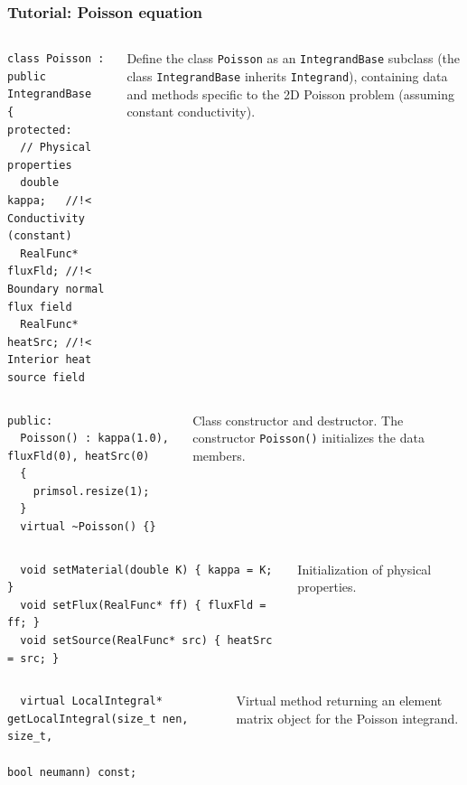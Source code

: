 \documentclass{beamer}
\begin{document}
\begin{frame}[fragile] %
 \frametitle{Tutorial: Poisson equation}

 \begin{columns}[c]
  \tiny\begin{verbatim}
class Poisson : public IntegrandBase
{
protected:
  // Physical properties
  double    kappa;   //!< Conductivity (constant)
  RealFunc* fluxFld; //!< Boundary normal flux field
  RealFunc* heatSrc; //!< Interior heat source field
  \end{verbatim}
   \small
  Define the class {\tt Poisson} as an {\tt IntegrandBase} subclass
  {\scriptsize(the class {\tt IntegrandBase} inherits {\tt Integrand})},
  containing data and methods specific to the 2D Poisson problem
  (assuming constant conductivity).
 \end{columns}
 \pause
 \begin{columns}[c]
  \tiny\begin{verbatim}
public:
  Poisson() : kappa(1.0), fluxFld(0), heatSrc(0)
  {
    primsol.resize(1);
  }
  virtual ~Poisson() {}
  \end{verbatim}
  \small
  Class constructor and destructor.
  The constructor {\tt Poisson()} initializes the data members.
 \end{columns}
 \pause
 \begin{columns}[c]
  \tiny\begin{verbatim}
  void setMaterial(double K) { kappa = K; }
  void setFlux(RealFunc* ff) { fluxFld = ff; }
  void setSource(RealFunc* src) { heatSrc = src; }
  \end{verbatim}
   \small
  Initialization of physical properties.
 \end{columns}
 \pause
 \begin{columns}[c]
  \tiny\begin{verbatim}
  virtual LocalIntegral* getLocalIntegral(size_t nen, size_t,
                                          bool neumann) const;
  \end{verbatim}
   \small
  Virtual method returning an element matrix object for the Poisson integrand.
 \end{columns}

\end{frame}
\end{document}
